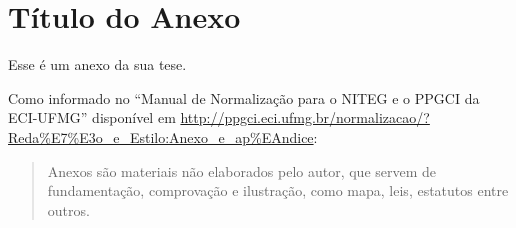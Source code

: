 \chapter{Título do Anexo}
Esse é um anexo da sua tese.

Como informado no ``Manual de Normalização para o NITEG e o PPGCI da ECI-UFMG''
disponível em
\url{http://ppgci.eci.ufmg.br/normalizacao/?Reda%E7%E3o_e_Estilo:Anexo_e_ap%EAndice}:
\begin{quote}
  Anexos são materiais não elaborados pelo autor, que servem de fundamentação,
  comprovação e ilustração, como mapa, leis, estatutos entre outros.
\end{quote}